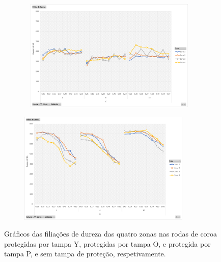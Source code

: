 \begin{figure}[htb]
\begin{subfigure}{.4\textwidth}
    \end{subfigure}
    \begin{subfigure}{.4\textwidth}\
        \centering
        \includegraphics[width = 0.9\textwidth]{Figures/Cap4/Grafico_4_Zonas_P.png}
        \caption{}
        \label{fig:resultados_Tampa_P}
    \end{subfigure}%
    \begin{subfigure}{.4\textwidth}
        \centering
        \includegraphics[width = 0.9\textwidth]{Figures/Cap4/Grafico_4_Zonas_ST.png}
        \caption{}
        \label{fig:resultados_ST}
    \end{subfigure}
    \caption[Filiações de dureza das quatro zonas na roda de coroa DB45 Nº 1]%
    {Gráficos das filiações de dureza das quatro zonas nas rodas de coroa protegidas por tampa Y, protegidas por tampa O, e protegida por tampa P, e sem tampa de proteção, respetivamente.}
\end{figure}
\newpage
\par
